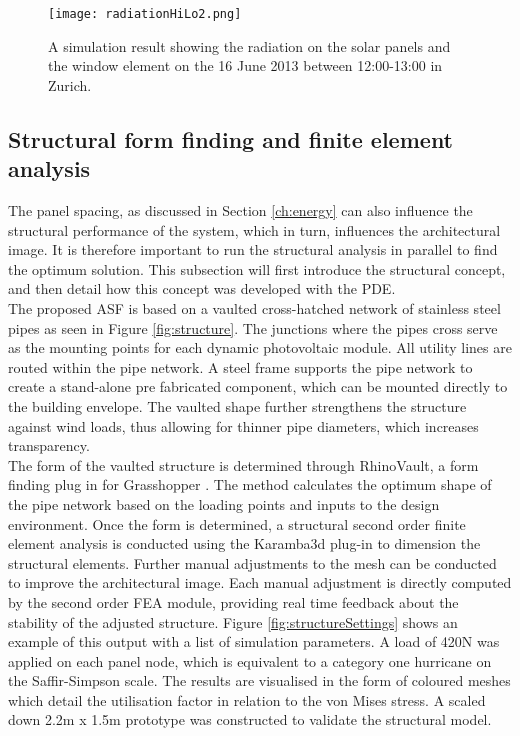 \begin{figure}
\begin{center}
\texttt{[image: radiationHiLo2.png]}
\caption{A simulation result showing the radiation on the solar panels and the window element on the 16 June 2013 between 12:00-13:00 in Zurich.}
\label{fig:radiation}
\end{center}
\end{figure}


\subsection{Structural form finding and finite element analysis}

The panel spacing, as discussed in Section \ref{ch:energy} can also influence the structural performance of the system, which in turn, influences the architectural image. It is therefore important to run the structural analysis in parallel to find the optimum solution. This subsection will first introduce the structural concept, and then detail how this concept was developed with the PDE.\\

The proposed ASF is based on a vaulted cross-hatched network of stainless steel pipes as seen in Figure \ref{fig:structure}. The junctions where the pipes cross serve as the mounting points for each dynamic photovoltaic module. All utility lines are routed within the pipe network. A steel frame supports the pipe network to create a stand-alone pre fabricated component, which can be mounted directly to the building envelope. The vaulted shape further strengthens the structure against wind loads, thus allowing for thinner pipe diameters, which increases transparency. \\


The form of the vaulted structure is determined through RhinoVault, a form finding plug in for Grasshopper \cite{Rippmann2012}. The method calculates the optimum shape of the pipe network based on the loading points and inputs to the design environment. Once the form is determined, a structural second order finite element analysis is conducted using the Karamba3d plug-in \cite{karamba} to dimension the structural elements. Further manual adjustments to the mesh can be conducted to improve the architectural image. Each manual adjustment is directly computed by the second order FEA module, providing real time feedback about the stability of the adjusted structure.  Figure \ref{fig:structureSettings} shows an example of this output with a list of simulation parameters. A load of 420N was applied on each panel node, which is equivalent to a category one hurricane on the Saffir-Simpson scale. The results are visualised in the form of coloured meshes which detail the utilisation factor in relation to the von Mises stress. A scaled down 2.2m x 1.5m prototype was constructed to validate the structural model. 

